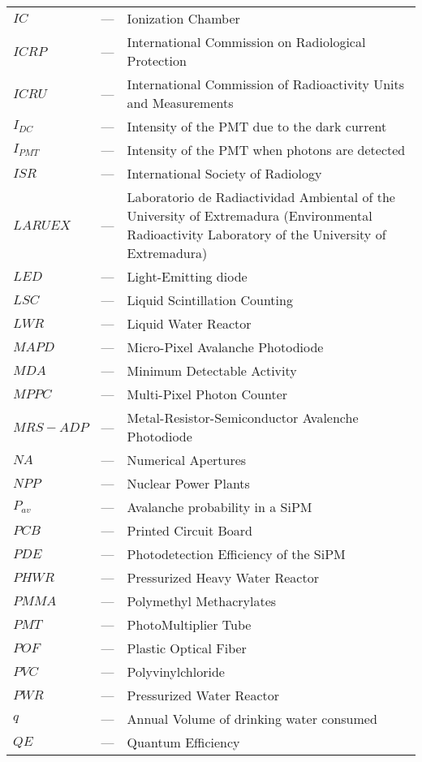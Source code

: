 \begin{longtable}{p{25mm} c p{120mm} }
$IC$ & --- & Ionization Chamber\\
$ICRP$ & --- & International Commission on Radiological Protection \\
$ICRU$ & --- & International Commission of Radioactivity Units 
\newline
and Measurements\\
$I_{DC}$ & --- & Intensity of the PMT due to the dark current\\
$I_{PMT}$ & --- & Intensity of the PMT when photons are detected\\
$ISR$ & --- & International Society of Radiology \\
$LARUEX$ & --- & Laboratorio de Radiactividad Ambiental of the University
\newline
of Extremadura (Environmental Radioactivity Laboratory
\newline
of the University of Extremadura)\\
$LED$ & --- & Light-Emitting diode \\
$LSC$ & --- & Liquid Scintillation Counting\\
$LWR$ & --- & Liquid Water Reactor\\
$MAPD$ & --- & Micro-Pixel Avalanche Photodiode\\
$MDA$ & --- & Minimum Detectable Activity\\
$MPPC$ & --- & Multi-Pixel Photon Counter\\
$MRS-ADP$ & --- & Metal-Resistor-Semiconductor Avalenche Photodiode\\
$NA$ & --- & Numerical Apertures\\
$NPP$ & --- & Nuclear Power Plants\\
$P_{av}$ & --- & Avalanche probability in a SiPM\\
$PCB$ & --- & Printed Circuit Board\\
$PDE$ & --- & Photodetection Efficiency of the SiPM\\
$PHWR$ & --- & Pressurized Heavy Water Reactor\\
$PMMA$ & --- & Polymethyl Methacrylates\\
$PMT$ & --- & PhotoMultiplier Tube\\
$POF$ & --- & Plastic Optical Fiber\\
$PVC$ & --- & Polyvinylchloride\\
$PWR$ & --- & Pressurized Water Reactor\\
$q$ & --- & Annual Volume of drinking water consumed\\
$QE$ & --- & Quantum Efficiency\\

\end{longtable}
